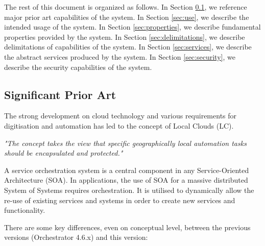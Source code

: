 \documentclass[a4paper]{arrowhead}
\begin{document}
The rest of this document is organized as follows.
In Section \ref{sec:prior_art}, we reference major prior art capabilities
of the system.
In Section \ref{sec:use}, we describe the intended usage of the system.
In Section \ref{sec:properties}, we describe fundamental properties
provided by the system.
In Section \ref{sec:delimitations}, we describe delimitations of capabilities
of the system.
In Section \ref{sec:services}, we describe the abstract services produced by the system.
In Section \ref{sec:security}, we describe the security capabilities
of the system.

\subsection{Significant Prior Art}
\label{sec:prior_art}

The strong development on cloud technology and various requirements for digitisation and automation has led to the concept of Local Clouds (LC).

\textit{"The concept takes the view that specific geographically local automation tasks should be encapsulated and protected."} \cite{jerker2017localclouds}

A service orchestration system is a central component in any Service-Oriented Architecture (SOA). In applications, the use of SOA for a massive distributed System of Systems requires orchestration. It is utilised to dynamically allow the re-use of existing services and systems in order to create new services and functionality. 

There are some key differences, even on conceptual level, between the previous versions (Orchestrator 4.6.x) and this version:
\end{document}
